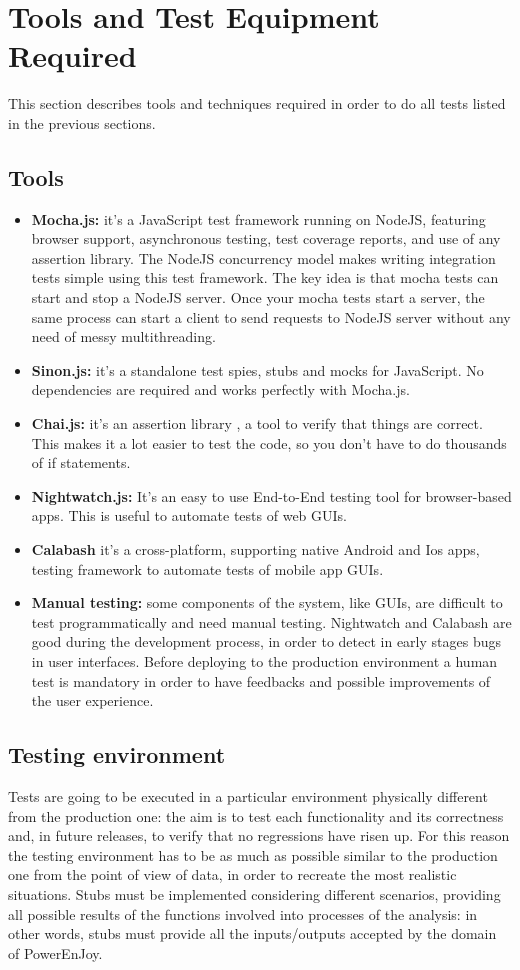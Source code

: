 \chapter{Tools and Test Equipment Required}
This section describes tools and techniques required in order to do all tests listed in the previous sections.

\section{Tools}
\begin{itemize}
\item \textbf{Mocha.js:} it’s a JavaScript test framework running on NodeJS, featuring browser support, asynchronous testing, test coverage reports, and use of any assertion library. The NodeJS concurrency model makes writing integration tests simple using this test framework. The key idea is that mocha tests can start and stop a NodeJS server. Once your mocha tests start a server, the same process can start a  client to send requests to NodeJS server without any need of messy multithreading.
\item \textbf{Sinon.js:} it’s a standalone test spies, stubs and mocks for JavaScript. No dependencies are required and works perfectly with Mocha.js.
\item \textbf{Chai.js:} it’s an assertion library , a tool to verify that things are correct. This makes it a lot easier to test the code, so you don't have to do thousands of if statements.
\item \textbf{Nightwatch.js:} It’s an easy to use End-to-End testing tool for browser-based apps. This is useful to automate tests of web GUIs.
\item \textbf{Calabash} it’s a cross-platform, supporting native Android and Ios apps, testing framework to automate tests of mobile app GUIs.
\item \textbf{Manual testing:} some components of the system, like GUIs, are difficult to test programmatically and need manual testing. Nightwatch and Calabash are good during the development process, in order to detect in early stages bugs in user interfaces. Before deploying to the production environment a human test is mandatory in order to have feedbacks and possible improvements of the user experience.
\end{itemize}

\section{Testing environment}
Tests are going to be executed in a particular environment physically different from the production one: the aim is to test each functionality and its correctness and, in future releases, to verify that no regressions have  risen up.
For this reason the testing environment has to be as much as possible similar to the production one from the point of view of data, in order to recreate the most realistic situations.
Stubs must be implemented considering different scenarios, providing all possible results of the functions involved into processes of the analysis: in other words, stubs must provide all the inputs/outputs accepted by the domain of PowerEnJoy.